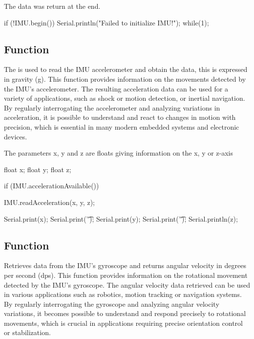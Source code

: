 The data was return at the end. 

\begin{Arduino}
    if (!IMU.begin()) {
        Serial.println("Failed to initialize IMU!");
        while(1){}; }
\end{Arduino}


\subsection{Function }

The  is used to read the IMU accelerometer and obtain the data, this is expressed in gravity (g). This function provides information on the movements detected by the IMU's accelerometer. The resulting acceleration data can be used for a variety of applications, such as shock or motion detection, or inertial navigation. By regularly interrogating the accelerometer and analyzing variations in acceleration, it is possible to understand and react to changes in motion with precision, which is essential in many modern embedded systems and electronic devices.

The parameters x, y and z are floats giving information on the x, y or z-axis 

\begin{Arduino}
    
    float x; 
    float y; 
    float z;
    
    if (IMU.accelerationAvailable()) {
        IMU.readAcceleration(x, y, z);
        
        Serial.print(x);
        Serial.print('\t');
        Serial.print(y);
        Serial.print('\t');
        Serial.println(z);	}
\end{Arduino}

\subsection{Function }

Retrieves data from the IMU's gyroscope and returns angular velocity in degrees per second (dps). This function provides information on the rotational movement detected by the IMU's gyroscope. The angular velocity data retrieved can be used in various applications such as robotics, motion tracking or navigation systems. By regularly interrogating the gyroscope and analyzing angular velocity variations, it becomes possible to understand and respond precisely to rotational movements, which is crucial in applications requiring precise orientation control or stabilization.

